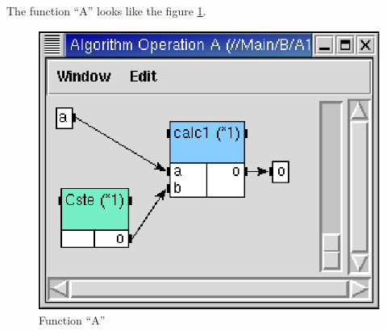 \documentclass[a4paper,twoside]{report}
\begin{document}
The function ``A'' looks like the figure \ref{A}.

\begin{figure}[htbp]
  \begin{center} 
        \includegraphics[width=0.5\linewidth]{OperationA.eps} 
  \end{center}
  \caption{Function ``A''} 
  \label{A}
\end{figure} 
\end{document}
